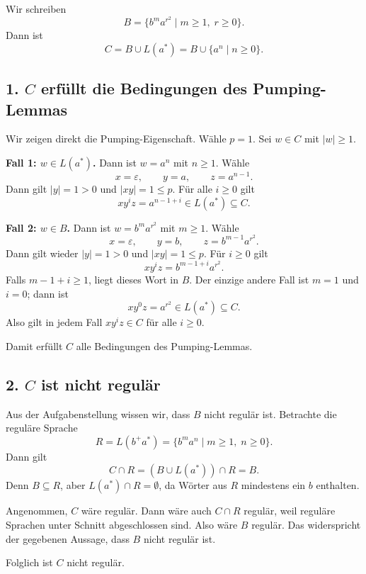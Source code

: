 \documentclass[a4paper,12pt]{article}
\begin{document}
Wir schreiben
\[
B=\{b^m a^{r^2}\mid m\ge 1,\; r\ge 0\}.
\]
Dann ist
\[
C = B \cup L(a^*) = B\cup \{a^n\mid n\ge 0\}.
\]

\subsection*{1. $C$ erfüllt die Bedingungen des Pumping-Lemmas}

Wir zeigen direkt die Pumping-Eigenschaft. Wähle $p=1$.
Sei $w\in C$ mit $|w|\ge 1$.

\medskip
\textbf{Fall 1: $w\in L(a^*)$.}
Dann ist $w=a^n$ mit $n\ge 1$.
Wähle
\[
    x=\varepsilon,\qquad y=a,\qquad z=a^{n-1}.
\]
Dann gilt $|y|=1>0$ und $|xy|=1\le p$.
Für alle $i\ge 0$ gilt
\[
    xy^iz = a^{n-1+i}\in L(a^*)\subseteq C.
\]

\medskip
\textbf{Fall 2: $w\in B$.}
Dann ist $w=b^m a^{r^2}$ mit $m\ge 1$.
Wähle
\[
    x=\varepsilon,\qquad y=b,\qquad z=b^{m-1}a^{r^2}.
\]
Dann gilt wieder $|y|=1>0$ und $|xy|=1\le p$.
Für $i\ge 0$ gilt
\[
    xy^iz = b^{m-1+i}a^{r^2}.
\]
Falls $m-1+i\ge 1$, liegt dieses Wort in $B$.
Der einzige andere Fall ist $m=1$ und $i=0$; dann ist
\[
    xy^0z=a^{r^2}\in L(a^*)\subseteq C.
\]
Also gilt in jedem Fall $xy^iz\in C$ für alle $i\ge 0$.

Damit erfüllt $C$ alle Bedingungen des Pumping-Lemmas.

\subsection*{2. $C$ ist nicht regulär}

Aus der Aufgabenstellung wissen wir, dass $B$ nicht regulär ist.
Betrachte die reguläre Sprache
\[
    R=L(b^+a^*)=\{b^m a^n\mid m\ge 1,\; n\ge 0\}.
\]
Dann gilt
\[
    C\cap R
    =
    (B\cup L(a^*))\cap R
    =
    B.
\]
Denn $B\subseteq R$, aber $L(a^*)\cap R=\emptyset$, da Wörter aus $R$ mindestens ein $b$ enthalten.

Angenommen, $C$ wäre regulär. Dann wäre auch $C\cap R$ regulär, weil reguläre Sprachen unter Schnitt abgeschlossen sind.
Also wäre $B$ regulär. Das widerspricht der gegebenen Aussage, dass $B$ nicht regulär ist.

Folglich ist $C$ nicht regulär.
\end{document}
